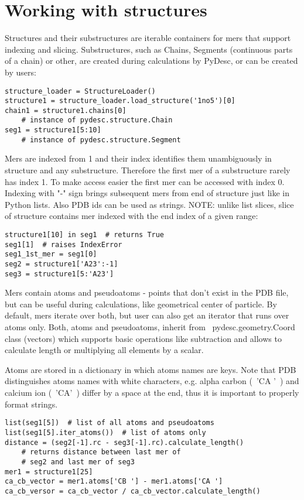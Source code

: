 \documentclass[a4paper,10pt]{article}
\begin{document}
\section{Working with structures}
Structures and their substructures are iterable containers for mers that support indexing and slicing. Substructures, such as Chains, Segments (continuous parts of a chain) or other, are created during calculations by PyDesc, or can be created by users:
\begin{lstlisting}
structure_loader = StructureLoader()
structure1 = structure_loader.load_structure('1no5')[0]
chain1 = structure1.chains[0]
	# instance of pydesc.structure.Chain
seg1 = structure1[5:10]
	# instance of pydesc.structure.Segment
\end{lstlisting}
Mers are indexed from 1 and their index identifies them unambiguously in structure and any substructure. Therefore the first mer of a substructure rarely has index 1. To make access easier the first mer can be accessed with index 0. Indexing with "-" sign brings subsequent mers from end of structure just like in Python lists. Also PDB ids can be used as strings. NOTE: unlike list slices, slice of structure contains mer indexed with the end index of a given range:
\begin{lstlisting}
structure1[10] in seg1  # returns True
seg1[1]  # raises IndexError
seg1_1st_mer = seg1[0]
seg2 = structure1['A23':-1]
seg3 = structure1[5:'A23']
\end{lstlisting}

Mers contain atoms and pseudoatoms - points that don't exist in the PDB file, but can be useful during calculations, like geometrical center of particle. By default, mers iterate over both, but user can also get an iterator that runs over atoms only. Both, atoms and pseudoatoms, inherit from ~pydesc.geometry.Coord~ class (vectors) which supports basic operations like subtraction and allows to calculate length or multiplying all elements by a scalar.

Atoms are stored in a dictionary in which atoms names are keys. Note that PDB distinguishes atoms names with white characters, e.g. alpha carbon (~'CA '~) and calcium ion (~'CA'~) differ by a space at the end, thus it is important to properly format strings.

\begin{lstlisting}
list(seg1[5])  # list of all atoms and pseudoatoms
list(seg1[5].iter_atoms())  # list of atoms only
distance = (seg2[-1].rc - seg3[-1].rc).calculate_length()
	# returns distance between last mer of
	# seg2 and last mer of seg3
mer1 = structure1[25]
ca_cb_vector = mer1.atoms['CB '] - mer1.atoms['CA ']
ca_cb_versor = ca_cb_vector / ca_cb_vector.calculate_length()
\end{lstlisting}
\end{document}
